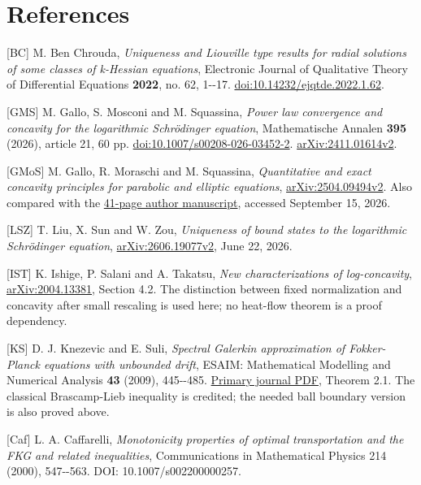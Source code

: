 \documentclass[11pt]{article}
\begin{document}
\raggedright{}\section{References}\label{references}

{[}BC{]} M. Ben Chrouda, \emph{Uniqueness and Liouville type results for
radial solutions of some classes of k-Hessian equations}, Electronic
Journal of Qualitative Theory of Differential Equations \textbf{2022},
no. 62, 1-\/-17.
\href{https://doi.org/10.14232/ejqtde.2022.1.62}{doi:10.14232/ejqtde.2022.1.62}.

{[}GMS{]} M. Gallo, S. Mosconi and M. Squassina, \emph{Power law
convergence and concavity for the logarithmic Schrödinger equation},
Mathematische Annalen \textbf{395} (2026), article 21, 60 pp.
\href{https://doi.org/10.1007/s00208-026-03452-2}{doi:10.1007/s00208-026-03452-2}.
\href{https://arxiv.org/abs/2411.01614v2}{arXiv:2411.01614v2}.

{[}GMoS{]} M. Gallo, R. Moraschi and M. Squassina, \emph{Quantitative
and exact concavity principles for parabolic and elliptic equations},
\href{https://arxiv.org/abs/2504.09494v2}{arXiv:2504.09494v2}. Also
compared with the
\href{https://www.dmf.unicatt.it/~squassin/papers/lavori/parabconc.pdf}{41-page
author manuscript}, accessed September 15, 2026.

{[}LSZ{]} T. Liu, X. Sun and W. Zou, \emph{Uniqueness of bound states to
the logarithmic Schrödinger equation},
\href{https://arxiv.org/abs/2606.19077v2}{arXiv:2606.19077v2}, June 22,
2026.

{[}IST{]} K. Ishige, P. Salani and A. Takatsu, \emph{New
characterizations of log-concavity},
\href{https://arxiv.org/abs/2004.13381}{arXiv:2004.13381}, Section 4.2.
The distinction between fixed normalization and concavity after small
rescaling is used here; no heat-flow theorem is a proof dependency.

{[}KS{]} D. J. Knezevic and E. Suli, \emph{Spectral Galerkin
approximation of Fokker-Planck equations with unbounded drift}, ESAIM:
Mathematical Modelling and Numerical Analysis \textbf{43} (2009),
445-\/-485.
\href{https://www.numdam.org/article/M2AN_2009__43_3_445_0.pdf}{Primary
journal PDF}, Theorem 2.1. The classical Brascamp-Lieb inequality is
credited; the needed ball boundary version is also proved above.

{[}Caf{]} L. A. Caffarelli, \emph{Monotonicity properties of optimal
transportation and the FKG and related inequalities}, Communications in
Mathematical Physics 214 (2000), 547-\/-563. DOI: 10.1007/s002200000257.
\end{document}
